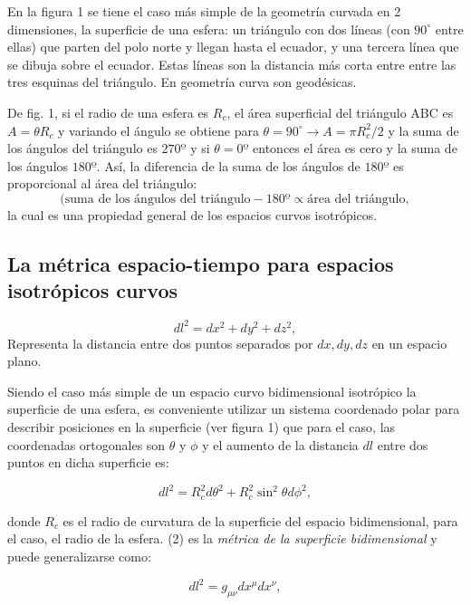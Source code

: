 \documentclass[11pt]{article}
\begin{document}
En la figura 1 se tiene el caso más simple de la geometría curvada en 2 dimensiones, la superficie de una esfera: un triángulo con dos líneas (con $90^{\circ}$ entre ellas) que parten del polo norte y llegan hasta el ecuador, y una tercera línea que se dibuja sobre el ecuador. Estas líneas son la distancia más corta entre entre las tres esquinas del triángulo. En geometría curva son geodésicas. 

De fig. 1, si el radio de una esfera es $R_c$, el área superficial del triángulo ABC es $A= \theta R_c$ y variando el ángulo se obtiene para $\theta = 90^{\circ} \rightarrow{A = \pi R_c^2/2}$ y la suma de los ángulos del triángulo es $270º$ y si $\theta=0º$ entonces el área es cero y la suma de los ángulos $180º$. Así, la diferencia de la suma de los ángulos de $180º$ es proporcional al área del triángulo:
$$(\text{suma de los ángulos del triángulo} - 180º \propto \text{área del triángulo},$$
la cual es una propiedad general de los espacios curvos isotrópicos. 

   \vspace{0.5cm}

\subsection{La métrica espacio-tiempo para espacios isotrópicos curvos}

\begin{equation}
  dl^2 = dx^2 + dy^2 + dz^2,  
\end{equation}
Representa la distancia entre dos puntos separados por $dx, dy, dz$ en un espacio plano. 

Siendo el caso más simple de un espacio curvo bidimensional isotrópico la superficie de una esfera, es conveniente utilizar un sistema coordenado polar para describir posiciones en la superficie (ver figura 1) que para el caso, las coordenadas ortogonales son $\theta$ y $\phi$ y el aumento de la distancia $dl$ entre dos puntos en dicha superficie es:

\begin{equation}
    dl^2 = R_c^2 d\theta^2 + R_c^2 \sin^2 \theta d\phi^2,
\end{equation}

    donde $R_c$ es el radio de curvatura de la superficie del espacio bidimensional, para el caso, el radio de la esfera. (2) es la {\textit{métrica de la superficie bidimensional}} y puede generalizarse como:
    
    \begin{equation}
        dl^2 = g_{\mu \nu} dx^{\mu} dx^{\nu}, 
    \end{equation}
    
\end{document}
